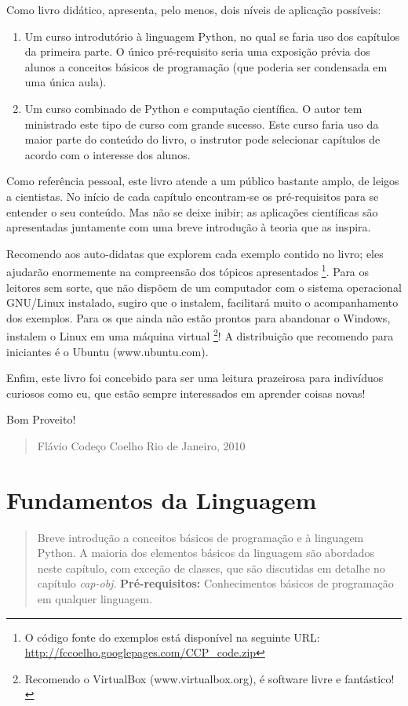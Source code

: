 \documentclass[a4paper,10pt,brazil]{sphinxmanual}
\begin{document}
Como livro didático, apresenta, pelo menos, dois níveis de
aplicação possíveis:
\begin{enumerate}
\item {} 
Um curso introdutório à linguagem Python, no qual se faria uso dos
capítulos da primeira parte. O único pré-requisito seria uma
exposição prévia dos alunos a conceitos básicos de programação (que
poderia ser condensada em uma única aula).

\item {} 
Um curso combinado de Python e computação científica. O autor tem
ministrado este tipo de curso com grande sucesso. Este curso faria
uso da maior parte do conteúdo do livro, o instrutor pode
selecionar capítulos de acordo com o interesse dos alunos.

\end{enumerate}

Como referência pessoal, este livro atende a um público bastante
amplo, de leigos a cientistas. No início de cada capítulo
encontram-se os pré-requisitos para se entender o seu conteúdo. Mas
não se deixe inibir; as aplicações científicas são apresentadas
juntamente com uma breve introdução à teoria que as inspira.

Recomendo aos auto-didatas que explorem cada exemplo contido no
livro; eles ajudarão enormemente na compreensão dos tópicos
apresentados \footnote{
O código fonte do exemplos está disponível na seguinte URL:
\href{http://fccoelho.googlepages.com/CCP\_code.zip}{http://fccoelho.googlepages.com/CCP\_code.zip}
}. Para os leitores sem sorte, que não dispõem de
um computador com o sistema operacional GNU/Linux instalado, sugiro
que o instalem, facilitará muito o acompanhamento dos exemplos.
Para os que ainda não estão prontos para abandonar o Windows,
instalem o Linux em uma máquina virtual \footnote{
Recomendo o VirtualBox (www.virtualbox.org), é software livre e
fantástico!
}! A distribuição que
recomendo para iniciantes é o Ubuntu (www.ubuntu.com).

Enfim, este livro foi concebido para ser uma leitura prazeirosa
para indivíduos curiosos como eu, que estão sempre interessados em
aprender coisas novas!

Bom Proveito!
\begin{quote}

Flávio Codeço Coelho
Rio de Janeiro, 2010
\end{quote}


\chapter{Fundamentos da Linguagem}
\label{Cap2:fundamentos-da-linguagem}\label{Cap2:cap-fundamentos}\label{Cap2::doc}\begin{quote}

Breve introdução a conceitos básicos de programação e à linguagem Python. A maioria dos elementos básicos da linguagem são abordados neste capítulo, com exceção de classes, que são discutidas em detalhe no capítulo \emph{cap-obj}. \textbf{Pré-requisitos:} Conhecimentos básicos de programação em qualquer linguagem.
\end{quote}
\end{document}
